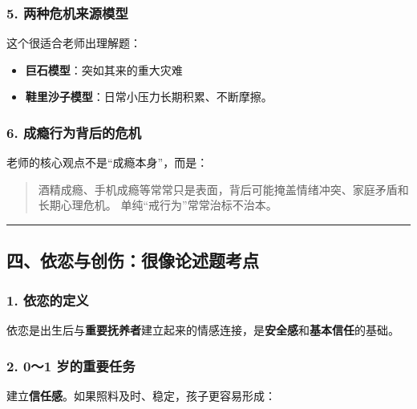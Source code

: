 \documentclass[
  a4paper,
]{ctexart}
\providecommand{\tightlist}{%
  \setlength{\itemsep}{0pt}\setlength{\parskip}{0pt}}
\begin{document}
\subsubsection{5.
两种危机来源模型}\label{ux4e24ux79cdux5371ux673aux6765ux6e90ux6a21ux578b}

这个很适合老师出理解题：

\begin{itemize}
\tightlist
\item
  \textbf{巨石模型}：突如其来的重大灾难
\item
  \textbf{鞋里沙子模型}：日常小压力长期积累、不断摩擦。
\end{itemize}

\subsubsection{6.
成瘾行为背后的危机}\label{ux6210ux763eux884cux4e3aux80ccux540eux7684ux5371ux673a}

老师的核心观点不是``成瘾本身''，而是：

\begin{quote}
酒精成瘾、手机成瘾等常常只是表面，背后可能掩盖情绪冲突、家庭矛盾和长期心理危机。
单纯``戒行为''常常治标不治本。
\end{quote}

\begin{center}\rule{0.5\linewidth}{0.5pt}\end{center}

\subsection{四、依恋与创伤：很像论述题考点}\label{ux56dbux4f9dux604bux4e0eux521bux4f24ux5f88ux50cfux8bbaux8ff0ux9898ux8003ux70b9}

\subsubsection{1. 依恋的定义}\label{ux4f9dux604bux7684ux5b9aux4e49}

依恋是出生后与\textbf{重要抚养者}建立起来的情感连接，是\textbf{安全感}和\textbf{基本信任}的基础。

\subsubsection{2. 0～1
岁的重要任务}\label{ux5c81ux7684ux91cdux8981ux4efbux52a1}

建立\textbf{信任感}。如果照料及时、稳定，孩子更容易形成：
\end{document}

